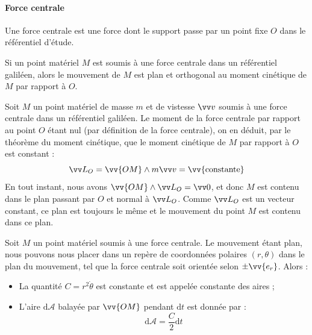 \documentclass[11pt,fleqn]{book} %
\newcommand{\dd}{\mathrm{d}}
\begin{document}
\paragraph{Force centrale}

\begin{definition}
    Une force centrale est une force dont le support passe par un point fixe $O$ dans le référentiel d'étude.
\end{definition}

\begin{proposition}
    Si un point matériel $M$ est soumis à une force centrale dans un référentiel galiléen, alors le mouvement de $M$ est plan et orthogonal au moment cinétique de $M$ par rapport à $O$.
\end{proposition}

\begin{demonstration}
    Soit $M$ un point matériel de masse $m$ et de vistesse $\vv v$ soumis à une force centrale dans un référentiel galiléen. Le moment de la force centrale par rapport au point $O$ étant nul (par définition de la force centrale), on en déduit, par le théorème du moment cinétique, que le moment cinétique de $M$ par rapport à $O$ est constant :
    \begin{equation}
        \vv L_O = \vv{OM} \wedge m \vv v = \vv{\mathrm{constante}}
    \end{equation}
    En tout instant, nous avons $\vv{OM} \wedge \vv L_O = \vv 0$, et donc $M$ est contenu dans le plan passant par $O$ et normal à $\vv L_O$. Comme $\vv L_O$ est un vecteur constant, ce plan est toujours le même et le mouvement du point $M$ est contenu dans ce plan. 
\end{demonstration}

\begin{proposition}
    Soit $M$ un point matériel soumis à une force centrale. Le mouvement étant plan, nous pouvons nous placer dans un repère de coordonnées polaires $(r,\theta)$ dans le plan du mouvement, tel que la force centrale soit orientée selon $\pm \vv{e_r}$. Alors :
    \begin{itemize}
        \item La quantité $C = r^2 \dot \theta$ est constante et est appelée constante des aires ;
        \item L'aire $\dd \mathcal{A}$ balayée par $\vv{OM}$ pendant $\dd t$ est donnée par :
        \begin{equation}
            \dd \mathcal{A} = \frac{C}{2} \dd t
        \end{equation}
    \end{itemize}
\end{proposition}
\end{document}
